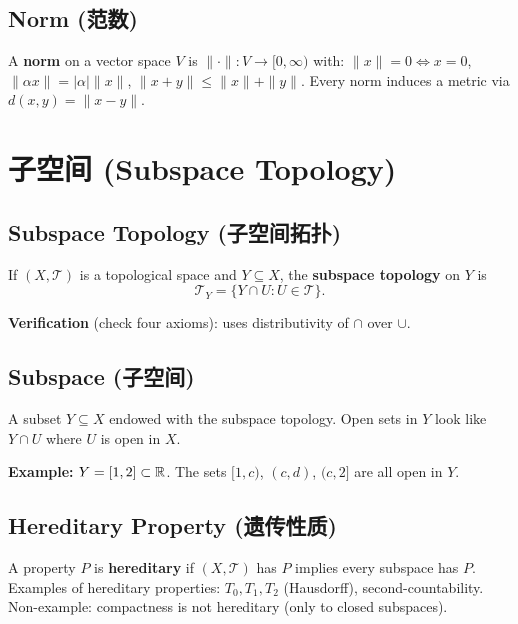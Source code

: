 \documentclass{article}
\begin{document}
\subsection{Norm (范数)}\label{def:norm}
A \textbf{norm} on a vector space $V$ is $\|\cdot\| : V \to [0, \infty)$ with:
$\|x\| = 0 \iff x = 0$, $\|\alpha x\| = |\alpha|\|x\|$, $\|x + y\|
\le \|x\| + \|y\|$.
Every norm induces a metric via $d(x, y) = \|x - y\|$.

\section{子空间 (Subspace Topology)}

\subsection{Subspace Topology (子空间拓扑)}\label{def:subspace-topo}
\begin{definition}
  If $(X, \mathcal{T})$ is a topological space and $Y \subseteq X$,
  the \textbf{subspace topology} on $Y$ is
  \[
    \mathcal{T}_Y = \{Y \cap U : U \in \mathcal{T}\}.
  \]
\end{definition}
\textbf{Verification} (check four axioms): uses distributivity of
$\cap$ over $\cup$.

\subsection{Subspace (子空间)}\label{def:subspace}
A subset $Y \subseteq X$ endowed with the subspace topology. Open
sets in $Y$ look like $Y \cap U$ where $U$ is open in $X$.

\textbf{Example:} $Y = [1, 2] \subset \mathbb{R}$. The sets $[1, c)$, $(c,
d)$, $(c, 2]$ are all open in $Y$.

\subsection{Hereditary Property (遗传性质)}\label{def:hereditary}
A property $P$ is \textbf{hereditary} if $(X, \mathcal{T})$ has $P$
implies every subspace has $P$.
Examples of hereditary properties: $T_0, T_1, T_2$ (Hausdorff),
second-countability.
Non-example: compactness is not hereditary (only to closed subspaces).

\end{document}
